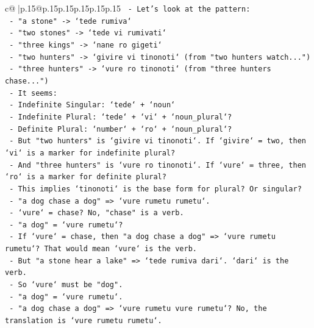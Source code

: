 \documentclass{article}
\begin{document}
{\begin{supertabular}{c@{$\;$}|p{.15\linewidth}@{}p{.15\linewidth}p{.15\linewidth}p{.15\linewidth}p{.15\linewidth}p{.15\linewidth}}
{{{\texttt{                 {-} Let's look at the pattern:} \\
\texttt{                   {-} "a stone" {-}> `tede rumiva`} \\
\texttt{                   {-} "two stones" {-}> `tede vi rumivati`} \\
\texttt{                   {-} "three kings" {-}> `nane ro gigeti`} \\
\texttt{                   {-} "two hunters" {-}> `givire vi tinonoti` (from "two hunters watch...")} \\
\texttt{                   {-} "three hunters" {-}> `vure ro tinonoti` (from "three hunters chase...")} \\
\texttt{                 {-} It seems:} \\
\texttt{                   {-} Indefinite Singular: `tede` + `noun`} \\
\texttt{                   {-} Indefinite Plural: `tede` + `vi` + `noun\_plural`?} \\
\texttt{                   {-} Definite Plural: `number` + `ro` + `noun\_plural`?} \\
\texttt{                   {-} But "two hunters" is `givire vi tinonoti`. If `givire` = two, then `vi` is a marker for indefinite plural?} \\
\texttt{                   {-} And "three hunters" is `vure ro tinonoti`. If `vure` = three, then `ro` is a marker for definite plural?} \\
\texttt{                   {-} This implies `tinonoti` is the base form for plural? Or singular?} \\
\texttt{                   {-} "a dog chase a dog" => `vure rumetu rumetu`.} \\
\texttt{                     {-} `vure` = chase? No, "chase" is a verb.} \\
\texttt{                     {-} "a dog" = `vure rumetu`?} \\
\texttt{                     {-} If `vure` = chase, then "a dog chase a dog" => `vure rumetu rumetu`? That would mean `vure` is the verb.} \\
\texttt{                     {-} But "a stone hear a lake" => `tede rumiva dari`. `dari` is the verb.} \\
\texttt{                     {-} So `vure` must be "dog".} \\
\texttt{                     {-} "a dog" = `vure rumetu`.} \\
\texttt{                     {-} "a dog chase a dog" => `vure rumetu vure rumetu`? No, the translation is `vure rumetu rumetu`.} \\
}}}
\end{supertabular}}
\end{document}
